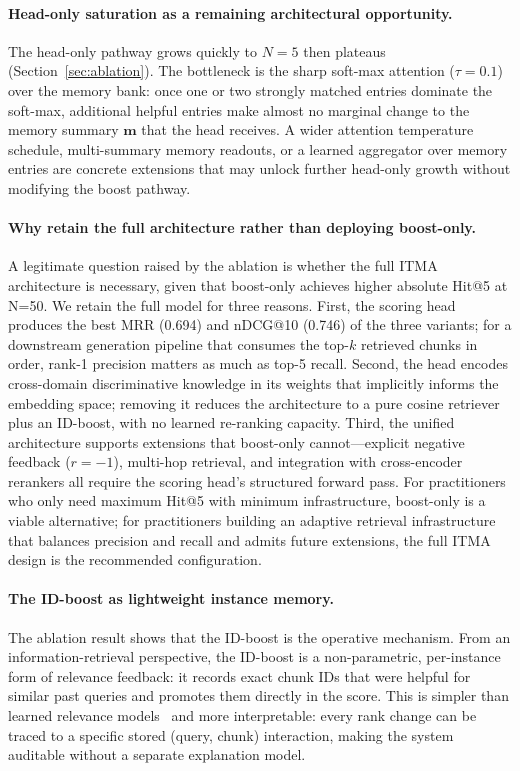 \documentclass[preprint,12pt]{elsarticle}
\begin{document}
\paragraph{Head-only saturation as a remaining architectural opportunity.}
The head-only pathway grows quickly to $N{=}5$ then plateaus
(Section~\ref{sec:ablation}).  The bottleneck is the sharp soft-max
attention ($\tau{=}0.1$) over the memory bank: once one or two strongly
matched entries dominate the soft-max, additional helpful entries make
almost no marginal change to the memory summary $\mathbf{m}$ that the head
receives.  A wider attention temperature schedule, multi-summary memory
readouts, or a learned aggregator over memory entries are concrete
extensions that may unlock further head-only growth without modifying the
boost pathway.

\paragraph{Why retain the full architecture rather than deploying boost-only.}
A legitimate question raised by the ablation is whether the full ITMA
architecture is necessary, given that boost-only achieves higher absolute
Hit@5 at N=50.  We retain the full model for three reasons.  First, the
scoring head produces the best MRR (0.694) and nDCG@10 (0.746) of the
three variants; for a downstream generation pipeline that consumes the
top-$k$ retrieved chunks in order, rank-1 precision matters as much as
top-5 recall.  Second, the head encodes cross-domain discriminative
knowledge in its weights that implicitly informs the embedding space;
removing it reduces the architecture to a pure cosine retriever plus an
ID-boost, with no learned re-ranking capacity.  Third, the unified
architecture supports extensions that boost-only cannot---explicit
negative feedback ($r{=}-1$), multi-hop retrieval, and integration with
cross-encoder rerankers all require the scoring head's structured forward
pass.  For practitioners who only need maximum Hit@5 with minimum
infrastructure, boost-only is a viable alternative; for practitioners
building an adaptive retrieval infrastructure that balances precision and
recall and admits future extensions, the full ITMA design is the
recommended configuration.

\paragraph{The ID-boost as lightweight instance memory.}
The ablation result shows that the ID-boost is the operative mechanism.
From an information-retrieval perspective, the ID-boost is a
non-parametric, per-instance form of relevance feedback: it records exact
chunk IDs that were helpful for similar past queries and promotes them
directly in the score.  This is simpler than learned relevance
models~\citep{lavrenko2001relevance} and more interpretable: every rank change
can be traced to a specific stored (query, chunk) interaction, making the
system auditable without a separate explanation model.
\end{document}
